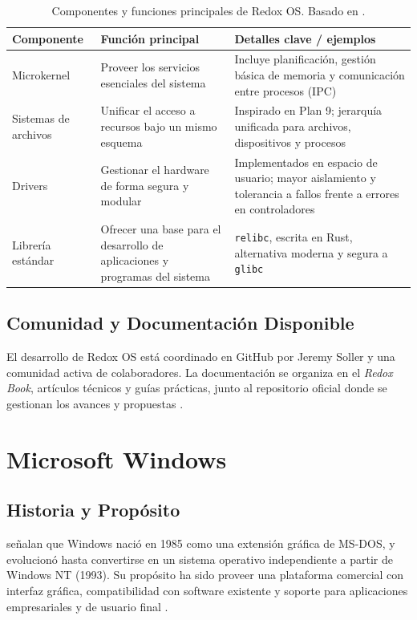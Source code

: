 \begin{table}[H]
\centering
\begin{tabular}{p{3.2cm}p{5cm}p{6cm}}
\hline
\textbf{Componente} & \textbf{Función principal} & \textbf{Detalles clave / ejemplos} \\
\hline
Microkernel & Proveer los servicios esenciales del sistema & Incluye planificación, gestión básica de memoria y comunicación entre procesos (IPC) \\
\hline
Sistemas de archivos & Unificar el acceso a recursos bajo un mismo esquema & Inspirado en Plan 9; jerarquía unificada para archivos, dispositivos y procesos \\
\hline
Drivers & Gestionar el hardware de forma segura y modular & Implementados en espacio de usuario; mayor aislamiento y tolerancia a fallos frente a errores en controladores \\
\hline
Librería estándar & Ofrecer una base para el desarrollo de aplicaciones y programas del sistema & \texttt{relibc}, escrita en Rust, alternativa moderna y segura a \texttt{glibc} \\
\hline
\end{tabular}
\caption[Componentes y funciones clave de Redox OS]{Componentes y funciones principales de Redox OS. Basado en \textcite{redox-docs}.}
\label{tab:componentes-redox}
\end{table}


\subsection{Comunidad y Documentación Disponible}
El desarrollo de Redox OS está coordinado en GitHub por Jeremy Soller y una comunidad activa de colaboradores.  
La documentación se organiza en el \textit{Redox Book}, artículos técnicos y guías prácticas, 
junto al repositorio oficial donde se gestionan los avances y propuestas \parencite{redox-github}.


\section{Microsoft Windows}

\subsection{Historia y Propósito}
\textcite{windows-history} señalan que Windows nació en 1985 como una extensión gráfica de MS-DOS, 
y evolucionó hasta convertirse en un sistema operativo independiente a partir de Windows NT (1993).  
Su propósito ha sido proveer una plataforma comercial con interfaz gráfica, compatibilidad con software 
existente y soporte para aplicaciones empresariales y de usuario final \parencite{microsoftdocs}.  

